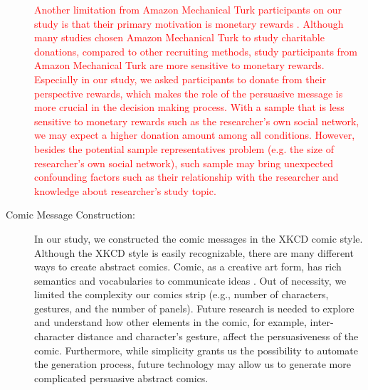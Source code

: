 \begin{description}
\textcolor{red}{Another limitation from Amazon Mechanical Turk participants on our study is that their primary motivation is monetary rewards \cite{paolacci2010running,paolacci2014inside}. Although many studies \cite{lee2013does,saunders2016no,sussman2015framing,arechar2017turking,branas2018gender} chosen Amazon Mechanical Turk to study charitable donations, compared to other recruiting methods, study participants from Amazon Mechanical Turk are more sensitive to monetary rewards. Especially in our study, we asked participants to donate from their perspective rewards, which makes the role of the persuasive message is more crucial in the decision making process. With a sample that is less sensitive to monetary rewards such as the researcher's own social network, we may expect a higher donation amount among all conditions. However, besides the potential sample representatives problem (e.g. the size of researcher's own social network), such sample may bring unexpected confounding factors such as their relationship with the researcher and knowledge about researcher's study topic.}     
  
 \item[Comic Message Construction:] In our study, we constructed the comic messages in the XKCD comic style. Although the XKCD style is easily recognizable, there are many different ways to create abstract comics.  Comic, as a creative art form, has rich semantics and vocabularies to communicate ideas \cite{scott1993understanding}. Out of necessity, we limited the complexity our comics strip (e.g., number of characters, gestures, and the number of panels). Future research is needed to explore and understand how other elements in the comic, for example, inter-character distance and character's gesture, affect the persuasiveness of the comic. Furthermore, while simplicity grants us the possibility to automate the generation process, future technology may allow us to generate more complicated persuasive abstract comics.
  
\end{description}


